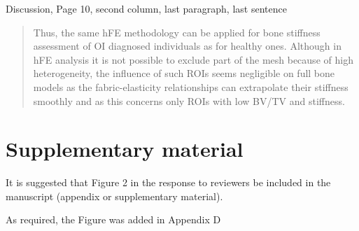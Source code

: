 \documentclass{AR2RC}
\begin{document}
Discussion, Page 10, second column, last paragraph, last sentence
\begin{quote}
	Thus, the same hFE methodology can be applied for bone stiffness assessment of OI diagnosed individuals as for healthy ones. Although in hFE analysis it is not possible to exclude part of the mesh because of high heterogeneity, the influence of such ROIs seems negligible on full bone models as the fabric-elasticity relationships can extrapolate their stiffness smoothly and as this concerns only ROIs with low BV/TV and stiffness.
\end{quote}

\section{Supplementary material}
\RC It is suggested that Figure 2 in the response to reviewers be included in the manuscript (appendix or supplementary material).

\AR As required, the Figure was added in Appendix D
\end{document}
